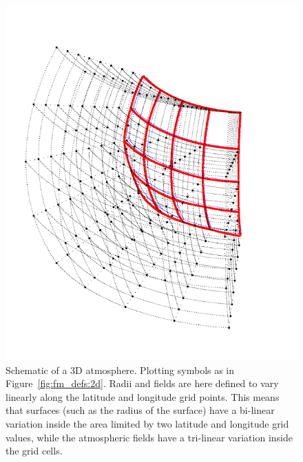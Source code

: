 \begin{figure}[!p]
 \begin{center}
  \includegraphics*[angle=-90,width=0.98\hsize]{atm_dim_3d}
  \vspace*{-15mm}
  \caption{Schematic of a 3D atmosphere. Plotting symbols as in 
    Figure~\ref{fig:fm_defs:2d}. Radii and fields are here defined to
    vary linearly along the latitude and longitude grid points. This
    means that surfaces (such as the radius of the surface) have a
    bi-linear variation inside the area limited by two latitude and
    longitude grid values, while the atmospheric fields have a
    tri-linear variation inside the grid cells. }
  \label{fig:fm_defs:3d}
 \end{center}
\end{figure}

